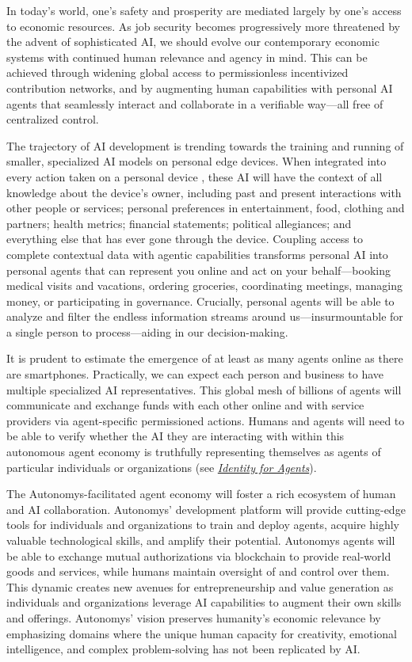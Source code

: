 \documentclass[conference]{IEEEtran}
\begin{document}
In today's world, one's safety and prosperity are mediated largely by one's access to economic resources. As job security becomes progressively more threatened by the advent of sophisticated AI\cite{frey2017}, we should evolve our contemporary economic systems with continued human relevance and agency in mind. This can be achieved through widening global access to permissionless incentivized contribution networks, and by augmenting human capabilities with personal AI agents that seamlessly interact and collaborate in a verifiable way—all free of centralized control.

The trajectory of AI development is trending towards the training and running of smaller, specialized AI models on personal edge devices. When integrated into every action taken on a personal device \cite{apple}, these AI will have the context of all knowledge about the device's owner, including past and present interactions with other people or services; personal preferences in entertainment, food, clothing and partners; health metrics; financial statements; political allegiances; and everything else that has ever gone through the device. Coupling access to complete contextual data with agentic capabilities transforms personal AI into personal agents that can represent you online and act on your behalf—booking medical visits and vacations, ordering groceries, coordinating meetings, managing money, or participating in governance. Crucially, personal agents will be able to analyze and filter the endless information streams around us—insurmountable for a single person to process—aiding in our decision-making.

It is prudent to estimate the emergence of at least as many agents online as there are smartphones. Practically, we can expect each person and business to have multiple specialized AI representatives. This global mesh of billions of agents will communicate and exchange funds with each other online and with service providers via agent-specific permissioned actions. Humans and agents will need to be able to verify whether the AI they are interacting with within this autonomous agent economy is truthfully representing themselves as agents of particular individuals or organizations (see \href{sec:agentids}{\textit{Identity for Agents}}).

The Autonomys-facilitated agent economy will foster a rich ecosystem of human and AI collaboration. Autonomys' development platform will provide cutting-edge tools for individuals and organizations to train and deploy agents, acquire highly valuable technological skills, and amplify their potential. Autonomys agents will be able to exchange mutual authorizations via blockchain to provide real-world goods and services, while humans maintain oversight of and control over them. This dynamic creates new avenues for entrepreneurship and value generation as individuals and organizations leverage AI capabilities to augment their own skills and offerings. Autonomys' vision preserves humanity's economic relevance by emphasizing domains where the unique human capacity for creativity, emotional intelligence, and complex problem-solving has not been replicated by AI.
\end{document}
